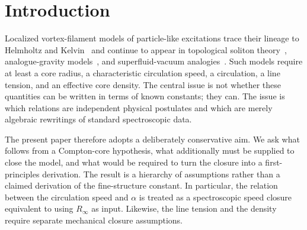 \documentclass[aps,pra,preprint,longbibliography,nofootinbib]{revtex4-2}
\begin{document}
\maketitle

\section{Introduction}
\label{sec:intro}

Localized vortex-filament models of particle-like excitations trace
their lineage to Helmholtz and Kelvin~\cite{Helmholtz1867,Kelvin1867}
and continue to appear in topological soliton theory~\cite{FaddeevNiemi1997},
analogue-gravity models~\cite{Barcelo2005}, and superfluid-vacuum
analogies~\cite{Volovik2003}.  Such models require at least a core
radius, a characteristic circulation speed, a circulation, a line
tension, and an effective core density.  The central issue is not
whether these quantities can be written in terms of known constants;
they can.  The issue is which relations are independent physical
postulates and which are merely algebraic rewritings of standard
spectroscopic data.

The present paper therefore adopts a deliberately conservative aim.  We
ask what follows from a Compton-core hypothesis, what additionally must
be supplied to close the model, and what would be required to turn the
closure into a first-principles derivation.  The result is a hierarchy of
assumptions rather than a claimed derivation of the fine-structure
constant.  In particular, the relation between the circulation speed and
$\alpha$ is treated as a spectroscopic speed closure equivalent to using
$R_\infty$ as input.  Likewise, the line tension and the density require
separate mechanical closure assumptions.
\end{document}
